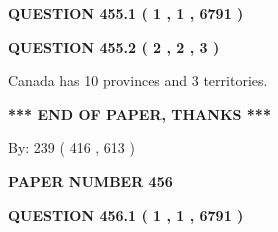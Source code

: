 \documentclass[12pt]{article}
\begin{document}
   
 \vspace{0.2in}
 
 
 
 
   
   
  
\vspace{0.2in}
  
{\textbf{\Large{QUESTION
455.1 
 ( 1 , 1 , 6791 )
}}}
  
  
  
\vspace{0.2in}
  
{\textbf{\Large{QUESTION
455.2 
 ( 2 , 2 , 3 )
}}}
  
  
 
 
\noindent{}
 
 
Canada has 10  provinces and 3 territories.
 
 
 
 
   
   
 \vspace{0.2in}
 
   
   
   
   
\vspace{1.0in} 
{\textbf{\large{ *** END OF PAPER, THANKS *** }}} 
   
   
\hspace{1.0in} By: 
 239 ( 416 ,  613 )
   
   
   
   
\newpage 
\setcounter{page}{ 
   456001 } 
   
   
   
   
 {\textbf{ \Large{ PAPER NUMBER  456  }}}
   
   
\vspace{0.2in}
   
   
   
   
   
   
 \vspace{0.2in}
 
 
 
 
   
   
  
\vspace{0.2in}
  
{\textbf{\Large{QUESTION
456.1 
 ( 1 , 1 , 6791 )
}}}
  
  
  
\end{document}
